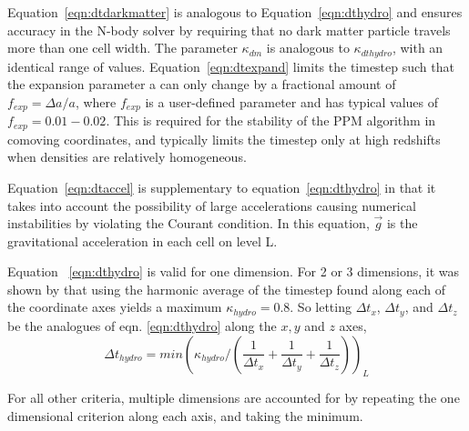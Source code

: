 Equation~\ref{eqn:dtdarkmatter} is analogous to Equation~\ref{eqn:dthydro} and ensures
accuracy in the N-body solver by requiring that no dark matter particle travels more than
one cell width.  The parameter $\kappa_{dm}$ is analogous to $\kappa_{dthydro}$, with
an identical range of values.  Equation~\ref{eqn:dtexpand} limits the timestep such 
that the expansion parameter a can only change by a fractional amount of $f_{exp} = \Delta a/a$, 
where $f_{exp}$ is a user-defined parameter and has typical values of $f_{exp} = 0.01-0.02$.
This is required for the stability of the PPM algorithm in comoving coordinates, and
typically limits the timestep only at high redshifts when densities are relatively
homogeneous.

Equation~\ref{eqn:dtaccel} is supplementary to equation~\ref{eqn:dthydro} in that it
takes into account the possibility of large accelerations causing numerical 
instabilities by violating the Courant condition.  In this equation, $\vec{g}$ is the
gravitational acceleration in each cell on level L.  

Equation ~\ref{eqn:dthydro} is valid for one dimension.  For 2 or 3
dimensions, it was shown by \cite{Godunov1959}  that using the
harmonic average of the timestep found along each of the coordinate
axes yields a maximum $\kappa_{hydro} = 0.8$.  So letting $\Delta
t_x$, $\Delta t_y$, and $\Delta t_z$ be the analogues of
eqn. \ref{eqn:dthydro} along the $x,y$ and $z$ axes, 
\begin{equation}
\Delta t_{hydro} = min ( \kappa_{hydro} /( \frac{1}{\Delta t_x}
+\frac{1}{\Delta t_y} + \frac{1}{\Delta t_z} ) )_L
\end{equation}

For all other criteria, multiple dimensions are accounted for by
repeating the one dimensional criterion along each axis, and taking
the minimum.
